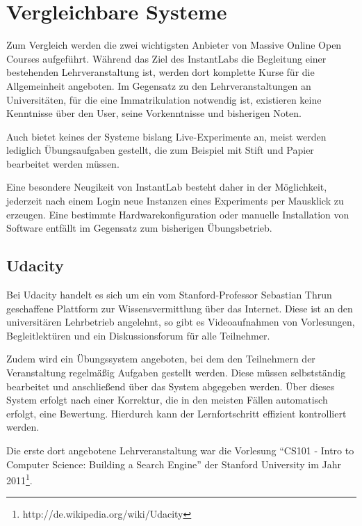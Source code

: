 \section{Vergleichbare Systeme}
\label{sec:solutions}
		


	Zum Vergleich werden die zwei wichtigsten Anbieter von Massive Online Open Courses aufgeführt. 
	Während das Ziel des InstantLabs die Begleitung einer bestehenden Lehrveranstaltung ist, werden dort komplette Kurse für die Allgemeinheit angeboten. 
	Im Gegensatz zu den Lehrveranstaltungen an Universitäten, für die eine Immatrikulation notwendig ist, existieren keine Kenntnisse über den User, seine Vorkenntnisse und bisherigen Noten. 

	Auch bietet keines der Systeme bislang Live-Experimente an, meist werden lediglich Übungsaufgaben gestellt, die zum Beispiel mit Stift und Papier bearbeitet werden müssen. 

	Eine besondere Neugikeit von InstantLab besteht daher in der Möglichkeit, jederzeit nach einem Login neue Instanzen eines Experiments per Mausklick zu erzeugen. 
	Eine bestimmte Hardwarekonfiguration oder manuelle Installation von Software entfällt im Gegensatz zum bisherigen Übungsbetrieb.
		

		\subsection{Udacity}

			Bei Udacity handelt es sich um ein vom Stanford-Professor Sebastian Thrun geschaffene Plattform zur Wissensvermittlung über das Internet.
			Diese ist an den universitären Lehrbetrieb angelehnt, so gibt es Videoaufnahmen von Vorlesungen, Begleitlektüren und ein Diskussionsforum für alle Teilnehmer. 


			Zudem wird ein Übungssystem angeboten, bei dem den Teilnehmern der Veranstaltung regelmäßig Aufgaben gestellt werden. Diese müssen selbstständig bearbeitet und anschließend über das System abgegeben werden.
			Über dieses System erfolgt nach einer Korrektur, die in den meisten Fällen automatisch erfolgt, eine Bewertung.
			Hierdurch kann der Lernfortschritt effizient kontrolliert werden. %

			Die erste dort angebotene Lehrveranstaltung war die Vorlesung "`CS101 - Intro to Computer Science: Building a Search Engine"' der Stanford University im Jahr 2011\footnote{http://de.wikipedia.org/wiki/Udacity}.

